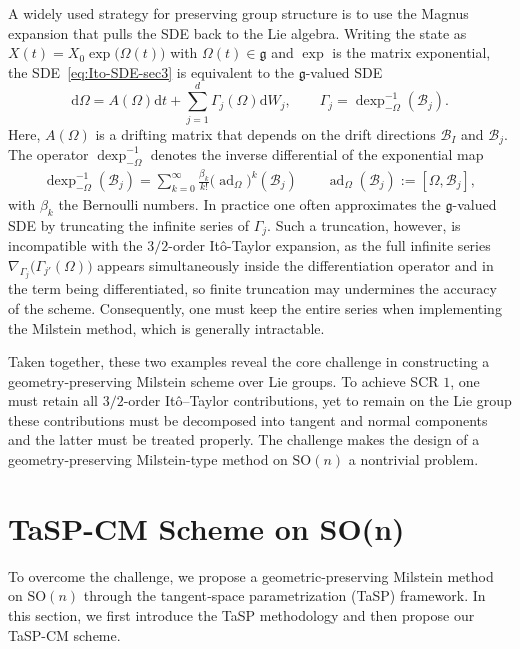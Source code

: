 \documentclass[11pt, a4paper, onecolumn]{article}
\newcommand{\SOn}{\mathrm{SO}(n)}
\newcommand{\B}{\mathcal{B}}
\newcommand{\tg}[1]{\mathcal{#1}}
\newcommand{\Der}[4]{
  #1_{#2}\bigl(#3(#4)\bigr)
}
\begin{document}
A widely used strategy for preserving group structure is to use the Magnus expansion that pulls the SDE back to the Lie algebra. Writing the state as $X(t)=X_0\exp\bigl(\Omega(t)\bigr)$ with
$\Omega(t)\in\mathfrak g$ and $\exp$ is the matrix exponential, the SDE~\cref{eq:Ito-SDE-sec3} is equivalent to the
$\mathfrak g$-valued SDE
\[
  \mathrm d\Omega
  = A(\Omega)\mathrm dt
    +\sum_{j=1}^{d}\Gamma_j(\Omega)\mathrm dW_j,\qquad
  \Gamma_j=\operatorname{dexp}^{-1}_{-\Omega}(\tg B_j).
\]
Here, $A(\Omega)$ is a drifting matrix that depends on the drift directions $\B_I$ and $\B_j$. The operator $\operatorname{dexp}_{-\Omega}^{-1}$ denotes the inverse differential of the exponential map
\begin{align}\label{eq:magnus}
    \operatorname{dexp}_{-\Omega}^{-1}(\tg B_j)= \sum_{k=0}^{\infty}\frac{\beta_{k}}{k!}
    \bigl(\operatorname{ad}_{\Omega}\bigr)^{k}(\tg B_j) \qquad \operatorname{ad}_{\Omega}(\tg B_j):=[\Omega,\tg B_j],
\end{align}
with $\beta_k$ the Bernoulli numbers. In practice one often approximates the $\mathfrak g$-valued SDE by truncating the infinite series of $\Gamma_j$. Such a truncation, however, is incompatible with the $3/2$-order It\^o-Taylor expansion, as the full infinite series $\Der{\nabla}{\Gamma_j}{\Gamma_{j'}}{\Omega}$ appears simultaneously inside the differentiation operator and in the term being differentiated, so finite truncation may undermines the accuracy of the scheme. Consequently, one must keep the entire series when implementing the Milstein method, which is generally intractable.

Taken together, these two examples reveal the core challenge in constructing a geometry-preserving Milstein scheme over Lie groups. To achieve SCR $1$, one must retain all $3/2$-order It\^o–Taylor contributions, yet to remain on the Lie group these contributions must be decomposed into tangent and normal components and the latter must be treated properly. The challenge makes the design of a geometry-preserving Milstein-type method on $\SOn$ a nontrivial problem.


\section{TaSP-CM Scheme on SO(n)}\label{sec:tasp-so}
To overcome the challenge, we propose a geometric-preserving Milstein method on $\SOn$ through the tangent‑space parametrization (TaSP) framework. In this section, we first introduce the TaSP methodology and then propose our TaSP-CM scheme.
\end{document}
